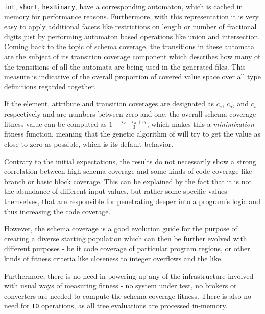 \begin{description}
  \texttt{int}, \texttt{short}, \texttt{hexBinary}, have a corresponding automaton, which is cached in memory
  for performance reasons. Furthermore, with this representation it is very easy to apply additional facets
  like restrictions on length or number of fractional digits just by performing automaton based operations
  like union and intersection.
  Coming back to the topic of schema coverage, the transitions in these automata are the subject of its 
  transition coverage component which describes how many of the transitions of all the automata are being 
  used in the generated \xml files. This measure is indicative of the overall proportion of covered value space 
  over all type definitions regarded together.
\end{description}

If the element, attribute and transition coverages are designated as $c_e$, $c_a$, and $c_t$ respectively and
are numbers between zero and one, the overall schema coverage fitness value can be computed as $1 -
\frac{c_e+c_a+c_t}{3}$, which makes this a \emph{minimization} fitness function, meaning that the genetic
algorithm of \evosuite will try to get the value as close to zero as possible, which is its default behavior.

Contrary to the initial expectations,  the results do not 
necessarily show a strong correlation between high schema coverage and some kinds of code coverage like 
branch or basic block coverage. This can be explained by the fact that it is not the abundance of different 
input values, but rather some specific values themselves, that are responsible for penetrating deeper into a 
program's logic and thus increasing the code coverage.

However, the schema coverage is a good evolution guide for the purpose of creating a diverse starting population
which can then be further evolved with different purposes - be it code coverage of particular program regions, or
other kinds of fitness criteria like closeness to integer overflows and the like.

Furthermore, there is no need in powering up any of the infrastructure involved with usual ways of measuring 
fitness - no system under test, no brokers or converters are needed to compute the schema coverage fitness. 
There is also no need for \texttt{IO} operations, as all \xml tree evaluations are processed in-memory.

